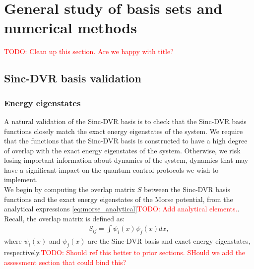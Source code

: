 \documentclass{subfiles}
\begin{document}
\section{General study of basis sets and numerical methods}\label{sec:general_study_results}
\textcolor{red}{TODO: Clean up this section. Are we happy with title?}
\subsection{Sinc-DVR basis validation}
\subsubsection*{Energy eigenstates}
A natural validation of the Sinc-DVR basis is to check that the Sinc-DVR basis functions closely match the exact energy eigenstates of the system. We require that the functions that the Sinc-DVR basis is constructed to have a high degree of overlap with the exact energy eigenstates of the system. Otherwise, we risk losing important information about dynamics of the system, dynamics that may have a significant impact on the quantum control protocols we wish to implement.\\ 

We begin by computing the overlap matrix $S$ between the Sinc-DVR basis functions and the exact energy eigenstates of the Morse potential, from the analytical expressions \ref{eq:morse_analytical}\textcolor{red}{TODO: Add analytical elements.}. Recall, the overlap matrix is defined as:
\begin{align*}
    S_{ij} = \int \psi_i(x) \psi_j(x) dx,
\end{align*}
where $\psi_i(x)$ and $\psi_j(x)$ are the Sinc-DVR basis and exact energy eigenstates, respectively.\textcolor{red}{TODO: Should ref this better to prior sections. SHould we add the assessment section that could bind this?} 
\end{document}
